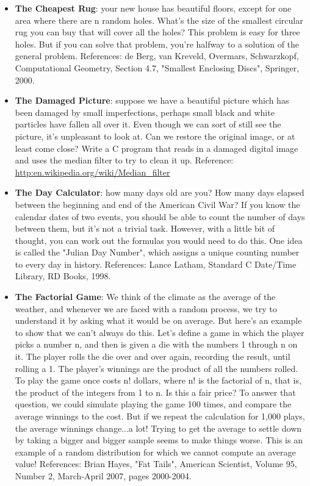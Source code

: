 \documentclass{article}
\begin{document}
\begin{itemize}
\item \textbf{The Cheapest Rug}: your new house has beautiful floors, except for one area where there are n random holes. What's the size of the smallest circular rug you can buy that will cover all the holes? This problem is easy for three holes. But if you can solve that problem, you're halfway to a solution of the general problem. References: de Berg, van Kreveld, Overmars, Schwarzkopf, Computational Geometry, Section 4.7, "Smallest Enclosing Discs", Springer, 2000.

\item \textbf{The Damaged Picture}: suppose we have a beautiful picture which has been damaged by small imperfections, perhaps small black and white particles have fallen all over it. Even though we can sort of still see the picture, it's unpleasant to look at. Can we restore the original image, or at least come close? Write a C program that reads in a damaged digital image and uses the median filter to try to clean it up. Reference:\url{ http:en.wikipedia.org/wiki/Median_filter}

\item \textbf{The Day Calculator}: how many days old are you? How many days elapsed between the beginning and end of the American Civil War? If you know the calendar dates of two events, you should be able to count the number of days between them, but it's not a trivial task. However, with a little bit of thought, you can work out the formulas you would need to do this. One idea is called the "Julian Day Number", which assigns a unique counting number to every day in history. References: Lance Latham, Standard C Date/Time Library, RD Books, 1998.

\item \textbf{The Factorial Game}: We think of the climate as the average of the weather, and whenever we are faced with a random process, we try to understand it by asking what it would be on average. But here's an example to show that we can't always do this. Let's define a game in which the player picks a number n, and then is given a die with the numbers 1 through n on it. The player rolls the die over and over again, recording the result, until rolling a 1. The player's winnings are the product of all the numbers rolled. To play the game once costs n! dollars, where n! is the factorial of n, that is, the product of the integers from 1 to n. Is this a fair price? To answer that question, we could simulate playing the game 100 times, and compare the average winnings to the cost. But if we repeat the calculation for 1,000 plays, the average winnings change...a lot! Trying to get the average to settle down by taking a bigger and bigger sample seems to make things worse. This is an example of a random distribution for which we cannot compute an average value! References: Brian Hayes, "Fat Tails", American Scientist, Volume 95, Number 2, March-April 2007, pages 2000-2004.


\end{itemize}
\end{document}
